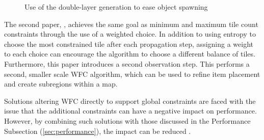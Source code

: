 \begin{figure}[H]
    \centering
    \hfill
    \caption{Use of the double-layer generation to ease object spawning \cite{WFC_Automatic_Rules_And_Better_Symmetries}}
    \label{fig:wfcMultiLayer}
\end{figure}

The second paper, \cite{WFC_Design_Constraints}, achieves the same goal as minimum and maximum tile count constraints through the use of a weighted choice. In addition to using entropy to choose the most constrained tile after each propagation step, assigning a weight to each choice can encourage the algorithm to choose a different balance of tiles. Furthermore, this paper introduces a second observation step. This performs a second, smaller scale WFC algorithm, which can be used to refine item placement and create subregions within a map.

Solutions altering WFC directly to support global constraints are faced with the issue that the additional constraints can have a negative impact on performance. However, by combining such solutions with those discussed in the Performance Subsection (\ref{sec:performance}), the impact can be reduced \cite{WFC_ConstraintSolving_and_ML}.

